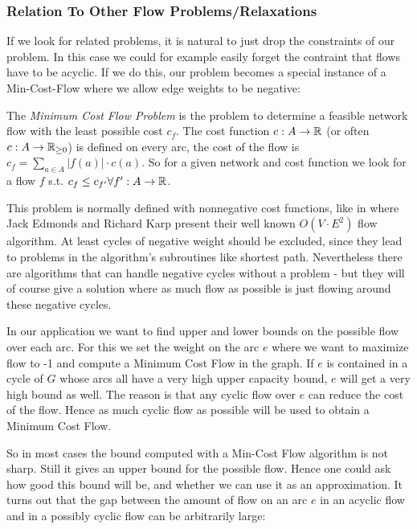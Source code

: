 \subsubsection{Relation To Other Flow Problems/Relaxations}

If we look for related problems, it is natural to just drop the constraints of our problem. In this case we could for 
example easily forget the contraint that flows have to be acyclic. If we do this, our problem becomes a special 
instance of a Min-Cost-Flow where we allow edge weights to be negative:

\begin{definition}\label{def:mincostflow}
 The \textit{Minimum Cost Flow Problem} is the problem to determine a feasible network flow with the least possible 
cost $c_f$. The cost function $c:A\to \mathbb{R}$ (or often $c:A\to \mathbb{R}_{\ge 0}$) is defined on every arc, the cost of the flow 
is $c_f = \sum_{a\in A}|f(a)|\cdot c(a)$. So for a given network and cost function we look for a flow $f$ s.t. $c_f\le 
c_{f'}\forall f':A\to \mathbb{R}$.
\end{definition}

This problem is normally defined with nonnegative cost functions, like in \cite{EdmondsKarp1972} where 
Jack Edmonds and Richard Karp present their well known $O(V\cdot E^2)$ flow algorithm. At least cycles of negative 
weight should be excluded, since they lead to problems in the algorithm's subroutines like shortest path. Nevertheless 
there are algorithms that can handle negative cycles without a problem - but they will of course give a solution 
where as much flow as possible is just flowing around these negative cycles. 

In our application we want to find upper and lower bounds on the possible flow over each arc. For this we set the 
weight on the arc $e$ where we want to maximize flow to -1 and compute a Minimum Cost Flow in the graph. If $e$ is 
contained in a cycle of $G$ whose arcs all have a very high upper capacity bound, $e$ will get a very high bound as 
well. The reason is that any cyclic flow over $e$ can reduce the cost of the flow. Hence as much cyclic flow as 
possible will be used to obtain a Minimum Cost Flow. 

So in most cases the bound computed with a Min-Cost Flow algorithm is not sharp. Still it gives an upper bound for the 
possible flow. Hence one could ask how good this bound will be, and whether we can use it as an approximation. It turns 
out that the gap between the amount of flow on an arc $e$ in an acyclic flow and in a possibly cyclic flow can be 
arbitrarily large:

